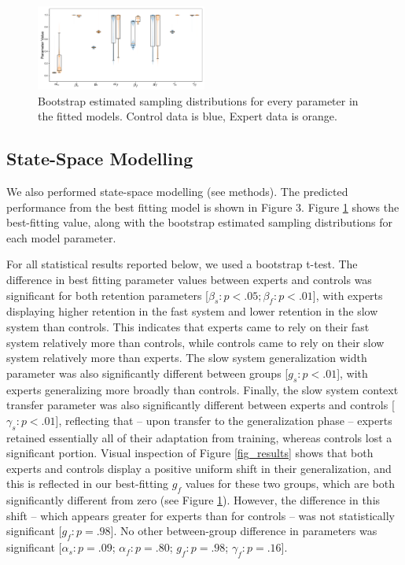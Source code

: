\documentclass[jou, 11pt, longtable, floatsintext, notab]{apa6}
\begin{document}
\begin{figure}[h]
  \centering
  \includegraphics[width=0.5\textwidth]{figures/fig_params.pdf}
  \caption{\scriptsize
    Bootstrap estimated sampling distributions for every
    parameter in the fitted models. Control data is blue, Expert
    data is orange.
  }
  \label{fig_params}
\end{figure}
\subsection{State-Space Modelling}
We also performed state-space modelling (see methods). The
predicted performance from the best fitting model is shown
in Figure 3. Figure \ref{fig_params} shows the best-fitting
value, along with the bootstrap estimated sampling
distributions for each model parameter.

For all statistical results reported below, we used a
bootstrap t-test. The difference in best fitting parameter
values between experts and controls was significant for both
retention parameters [$\beta_s: p<.05; \beta_f: p<.01$],
with experts displaying higher retention in the fast system
and lower retention in the slow system than controls. This
indicates that experts came to rely on their fast system
relatively more than controls, while controls came to rely
on their slow system relatively more than experts. The slow
system generalization width parameter was also significantly
different between groups [$g_s: p<.01$], with experts
generalizing more broadly than controls. Finally, the slow
system context transfer parameter was also significantly
different between experts and controls [$\gamma_s: p <
.01$], reflecting that -- upon transfer to the
generalization phase -- experts retained essentially all of
their adaptation from training, whereas controls lost a
significant portion. Visual inspection of Figure
\ref{fig_results} shows that both experts and controls
display a positive uniform shift in their generalization,
and this is reflected in our best-fitting $g_f$ values for
these two groups, which are both significantly different
from zero (see Figure \ref{fig_params}). However, the
difference in this shift -- which appears greater for
experts than for controls -- was not statistically
significant [$g_f: p=.98$]. No other between-group
difference in parameters was significant [$\alpha_s: p=.09$;
$\alpha_f: p=.80$; $g_f: p=.98$; $\gamma_f: p=.16$].
\end{document}
